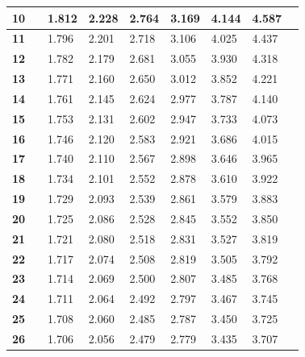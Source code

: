 \begin{alternateColorTable}
\begin{longtable}{|l|l l|l|l|l|l|l|l|}
    \textbf{10} & & 1.812 & 2.228 & 2.764 & 3.169 & 4.144 & 4.587\\ \hline
    
    \textbf{11} & & 1.796 & 2.201 & 2.718 & 3.106 & 4.025 & 4.437\\ \hline
    
    \textbf{12} & & 1.782 & 2.179 & 2.681 & 3.055 & 3.930 & 4.318\\ \hline
    
    \textbf{13} & & 1.771 & 2.160 & 2.650 & 3.012 & 3.852 & 4.221\\ \hline
    
    \textbf{14} & & 1.761 & 2.145 & 2.624 & 2.977 & 3.787 & 4.140\\ \hline
    
    \textbf{15} & & 1.753 & 2.131 & 2.602 & 2.947 & 3.733 & 4.073\\ \hline
    
    \textbf{16} & & 1.746 & 2.120 & 2.583 & 2.921 & 3.686 & 4.015\\ \hline
    
    \textbf{17} & & 1.740 & 2.110 & 2.567 & 2.898 & 3.646 & 3.965\\ \hline
    
    \textbf{18} & & 1.734 & 2.101 & 2.552 & 2.878 & 3.610 & 3.922\\ \hline
    
    \textbf{19} & & 1.729 & 2.093 & 2.539 & 2.861 & 3.579 & 3.883\\ \hline
    
    \textbf{20} & & 1.725 & 2.086 & 2.528 & 2.845 & 3.552 & 3.850\\ \hline
    
    \textbf{21} & & 1.721 & 2.080 & 2.518 & 2.831 & 3.527 & 3.819\\ \hline
    
    \textbf{22} & & 1.717 & 2.074 & 2.508 & 2.819 & 3.505 & 3.792\\ \hline
    
    \textbf{23} & & 1.714 & 2.069 & 2.500 & 2.807 & 3.485 & 3.768\\ \hline
    
    \textbf{24} & & 1.711 & 2.064 & 2.492 & 2.797 & 3.467 & 3.745\\ \hline
    
    \textbf{25} & & 1.708 & 2.060 & 2.485 & 2.787 & 3.450 & 3.725\\ \hline
    
    \textbf{26} & & 1.706 & 2.056 & 2.479 & 2.779 & 3.435 & 3.707\\ \hline
    

\end{longtable}
\end{alternateColorTable}
